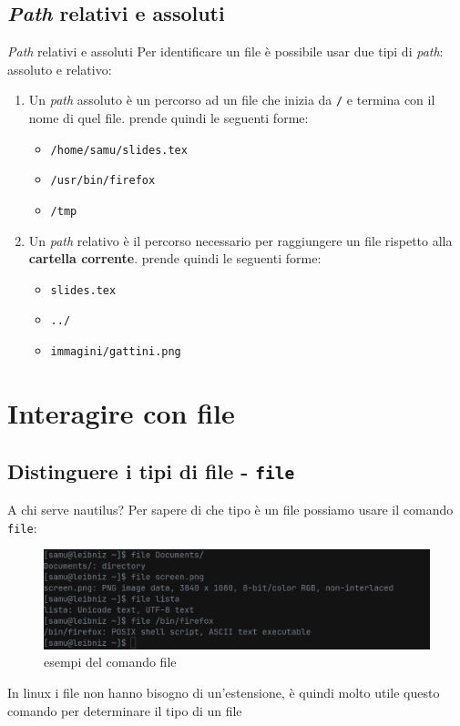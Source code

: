 \documentclass{beamer}
\begin{document}
\subsection{\textit{Path} relativi e assoluti}
\begin{frame}{\textit{Path} relativi e assoluti}
  Per identificare un file è possibile usar due tipi di \textit{path}: assoluto 
  e relativo:
  \begin{enumerate}
    \item Un \textit{path} assoluto è un percorso ad un file che inizia da 
      \texttt{/} e termina con il nome di quel file. prende quindi le seguenti
      forme:
      \begin{itemize}
        \item \texttt{/home/samu/slides.tex}
        \item \texttt{/usr/bin/firefox}
        \item \texttt{/tmp}
      \end{itemize}
    \item Un \textit{path} relativo è il percorso necessario per raggiungere un
      file rispetto alla \textbf{cartella corrente}. prende quindi le seguenti
      forme:
      \begin{itemize}
        \item \texttt{slides.tex}
        \item \texttt{../}
        \item \texttt{immagini/gattini.png}
      \end{itemize}
  \end{enumerate}
\end{frame}

\section{Interagire con file}

\subsection{Distinguere i tipi di file - \texttt{file}}
\begin{frame}{A chi serve nautilus?}
  Per sapere di che tipo è un file possiamo usare il comando \texttt{file}:
  \begin{figure}
    \includegraphics[width=\textwidth]{assets/command-file.png}
    \caption{esempi del comando file}
  \end{figure}
  In linux i file non hanno bisogno di un'estensione, è quindi molto utile 
  questo comando per determinare il tipo di un file
\end{frame}
\end{document}
